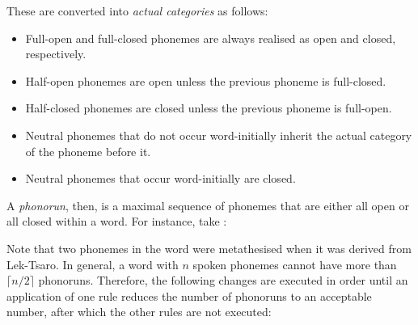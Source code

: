 \documentclass{book}
\begin{document}
These are converted into \emph{actual categories} as follows:

\begin{itemize}
  \item Full-open and full-closed phonemes are always realised as open and closed, respectively.
  \item Half-open phonemes are open unless the previous phoneme is full-closed.
  \item Half-closed phonemes are closed unless the previous phoneme is full-open.
  \item Neutral phonemes that do not occur word-initially inherit the actual category of the phoneme before it.
  \item Neutral phonemes that occur word-initially are closed.
\end{itemize}

A \emph{phonorun}, then, is a maximal sequence of phonemes that are either all open or all closed within a word. For instance, take :

\begin{center}
\end{center}

Note that two phonemes in the word were metathesised when it was derived from Lek-Tsaro. In general, a word with $n$ spoken phonemes cannot have more than $\lceil n/2 \rceil$ phonoruns. Therefore, the following changes are executed in order until an application of one rule reduces the number of phonoruns to an acceptable number, after which the other rules are not executed:
\end{document}
